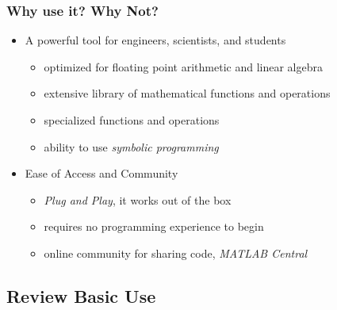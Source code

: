 \documentclass[fleqn]{beamer} %
\newcommand{\sectionIIsubsectionIItitle}{Why use it? Why Not?}
\newcommand{\sectionIIsubsectionIIItitle}{Review Basic Use}
\begin{document}
			\begin{frame}
				\frametitle{\sectionIIsubsectionIItitle}
				\bigskip

								\begin{itemize}
					\item A powerful tool for engineers, scientists, and students
					\begin{itemize}	
						\item  optimized for floating point arithmetic and linear algebra
						\item extensive library of mathematical functions and operations 
						\item specialized functions and operations
						\begin{itemize}
						\end{itemize}
						\item ability to use {\it symbolic programming }	
					\end{itemize}
					
					\item Ease of Access and Community
					\begin{itemize}
						\item {\it Plug and Play}, it works out of the box
						\item requires no programming experience to begin
						\item online community for sharing code,  {\it MATLAB Central}
					\end{itemize}
				\end{itemize}
				

				\btVFill 
			\end{frame}	

		\subsection{\sectionIIsubsectionIIItitle}\label{sectionIIsubsectionIII}
\end{document}
